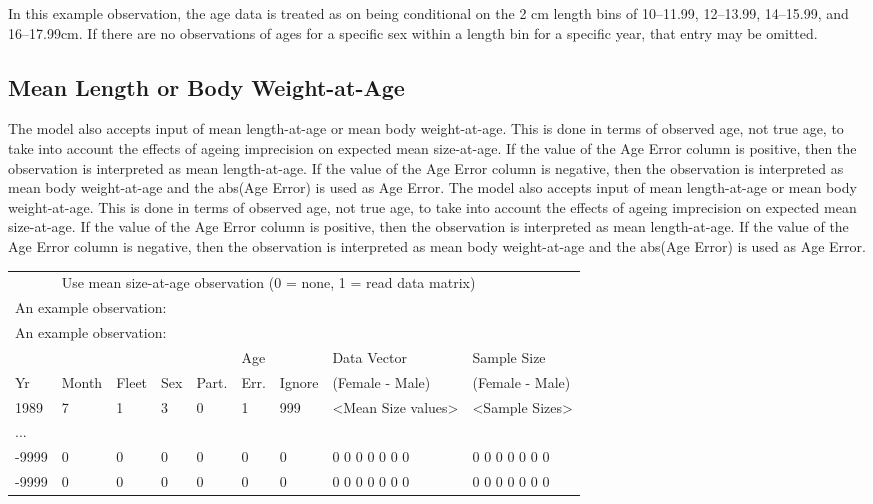 In this example observation, the age data is treated as on being conditional on the 2 cm length bins of 10--11.99, 12--13.99, 14--15.99, and 16--17.99cm. If there are no observations of ages for a specific sex within a length bin for a specific year, that entry may be omitted.

\subsection{Mean Length or Body Weight-at-Age}
The model also accepts input of mean length-at-age or mean body weight-at-age. This is done in terms of observed age, not true age, to take into account the effects of ageing imprecision on expected mean size-at-age. If the value of the Age Error column is positive, then the observation is interpreted as mean length-at-age. If the value of the Age Error column is negative, then the observation is interpreted as mean body weight-at-age and the abs(Age Error) is used as Age Error.
The model also accepts input of mean length-at-age or mean body weight-at-age. This is done in terms of observed age, not true age, to take into account the effects of ageing imprecision on expected mean size-at-age. If the value of the Age Error column is positive, then the observation is interpreted as mean length-at-age. If the value of the Age Error column is negative, then the observation is interpreted as mean body weight-at-age and the abs(Age Error) is used as Age Error.

\begin{center}
	\begin{tabular}{p{0.75cm} p{1cm} p{0.75cm} p{1cm} p{0.75cm} p{1cm} p{1cm} p{3.2cm} p{3.2cm}}
	\begin{tabular}{p{0.75cm} p{1cm} p{0.75cm} p{1cm} p{0.75cm} p{1cm} p{1cm} p{3.2cm} p{3.2cm}}
		\hline
		1 & \multicolumn{8}{l}{Use mean size-at-age observation (0 = none, 1 = read data matrix)} \Tstrut\\
		\multicolumn{9}{l}{An example observation:} \Bstrut\\
		\multicolumn{9}{l}{An example observation:} \Bstrut\\
		\hline
		   &       &       &     &       & Age  &        & Data Vector     & Sample Size \Tstrut\\
		Yr & Month & Fleet & Sex & Part. & Err. & Ignore & (Female - Male) & (Female - Male) \Bstrut\\
		\hline
		1989  & 7 & 1 & 3 & 0 & 1 & 999 & <Mean Size values> & <Sample Sizes> \Tstrut\\
		...   &   &   &   &   &   &   &  & \\
		-9999 & 0 & 0 & 0 & 0 & 0 & 0 & 0 0 0 0 0 0 0 & 0 0 0 0 0 0 0 \Bstrut\\
		-9999 & 0 & 0 & 0 & 0 & 0 & 0 & 0 0 0 0 0 0 0 & 0 0 0 0 0 0 0 \Bstrut\\
		\hline
	\end{tabular}
\end{center}


